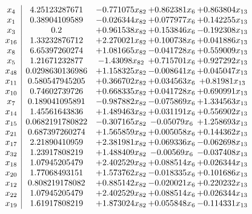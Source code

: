\documentclass[11pt]{article}
\begin{document}
\[\begin{array}{c| c c@{\hskip 2pt} c@{\hskip 2pt} c@{\hskip 2pt} }
 x_{4}   &  4.25123287671 & -0.771075 x_{82} & + 0.862381 x_{6} & + 0.863804 x_{13}\\
 x_{1}   &  0.38904109589 & -0.026344 x_{82} & + 0.077977 x_{6} & + 0.142255 x_{13}\\
 x_{3}   &  0.2 & + 0.961538 x_{82} & + 0.153846 x_{6} & -0.192308 x_{13}\\
 x_{16}   &  1.33232876712 & + 2.270021 x_{82} & + 0.100738 x_{6} & + 0.041886 x_{13}\\
 x_{8}   &  6.65397260274 & + 1.081665 x_{82} & -0.041728 x_{6} & + 0.559009 x_{13}\\
 x_{5}   &  1.21671232877 & -1.43098 x_{82} & + 0.715701 x_{6} & + 0.927292 x_{13}\\
 x_{48}   &  0.0298630136986 & + 1.158325 x_{82} & -0.008641 x_{6} & + 0.045047 x_{13}\\
 x_{11}   &  0.580547945205 & + 0.366702 x_{82} & + 0.034563 x_{6} & + 0.81981 x_{13}\\
 x_{10}   &  0.74602739726 & + 0.668335 x_{82} & + 0.041728 x_{6} & + 0.690991 x_{13}\\
 x_{7}   &  0.189041095891 & -0.987882 x_{82} & -0.075869 x_{6} & + 1.334563 x_{13}\\
 x_{14}   &  1.45561643836 & + 1.489463 x_{82} & + 0.031191 x_{6} & + 0.556902 x_{13}\\
 x_{15}   &  0.0682191780822 & -0.307165 x_{82} & -0.05079 x_{6} & + 1.258693 x_{13}\\
 x_{21}   &  0.687397260274 & + 1.565859 x_{82} & + 0.005058 x_{6} & + 0.144362 x_{13}\\
 x_{17}   &  2.21890410959 & + 2.381981 x_{82} & + 0.069336 x_{6} & -0.062698 x_{13}\\
 x_{32}   &  1.23917808219 & + 1.488409 x_{82} & -0.00569 x_{6} & -0.037408 x_{13}\\
 x_{18}   &  1.07945205479 & + 2.402529 x_{82} & + 0.088514 x_{6} & + 0.026344 x_{13}\\
 x_{20}   &  1.77068493151 & + 1.573762 x_{82} & -0.018335 x_{6} & + 0.101686 x_{13}\\
 x_{12}   &  0.808219178082 & + 0.885142 x_{82} & -0.020021 x_{6} & + 0.220232 x_{13}\\
 x_{22}   &  1.07945205479 & + 2.402529 x_{82} & + 0.088514 x_{6} & + 0.026344 x_{13}\\
 x_{19}   &  1.61917808219 & + 1.873024 x_{82} & + 0.055848 x_{6} & -0.114331 x_{13}\\

\end{array}\]
\end{document}
